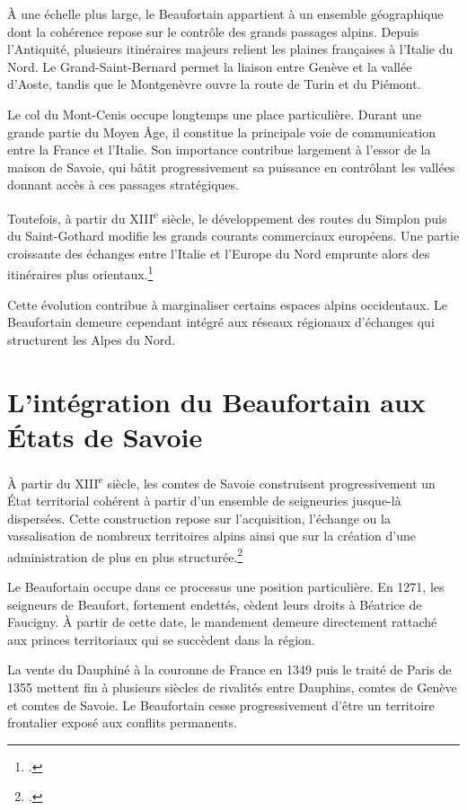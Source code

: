 \documentclass[12pt,a4paper]{report}
\begin{document}
À une échelle plus large, le Beaufortain appartient à un ensemble géographique dont la cohérence repose sur le contrôle des grands passages alpins. Depuis l'Antiquité, plusieurs itinéraires majeurs relient les plaines françaises à l'Italie du Nord. Le Grand-Saint-Bernard permet la liaison entre Genève et la vallée d'Aoste, tandis que le Montgenèvre ouvre la route de Turin et du Piémont.

Le col du Mont-Cenis occupe longtemps une place particulière. Durant une grande partie du Moyen Âge, il constitue la principale voie de communication entre la France et l'Italie. Son importance contribue largement à l'essor de la maison de Savoie, qui bâtit progressivement sa puissance en contrôlant les vallées donnant accès à ces passages stratégiques.

Toutefois, à partir du XIII\textsuperscript{e} siècle, le développement des routes du Simplon puis du Saint-Gothard modifie les grands courants commerciaux européens. Une partie croissante des échanges entre l'Italie et l'Europe du Nord emprunte alors des itinéraires plus orientaux.\footcite[63--82]{PRacine2003}

Cette évolution contribue à marginaliser certains espaces alpins occidentaux. Le Beaufortain demeure cependant intégré aux réseaux régionaux d'échanges qui structurent les Alpes du Nord.

\section{L'intégration du Beaufortain aux États de Savoie}

À partir du XIII\textsuperscript{e} siècle, les comtes de Savoie construisent progressivement un État territorial cohérent à partir d'un ensemble de seigneuries jusque-là dispersées. Cette construction repose sur l'acquisition, l'échange ou la vassalisation de nombreux territoires alpins ainsi que sur la création d'une administration de plus en plus structurée.\footcite[59]{Mouthon2016}

Le Beaufortain occupe dans ce processus une position particulière. En 1271, les seigneurs de Beaufort, fortement endettés, cèdent leurs droits à Béatrice de Faucigny. À partir de cette date, le mandement demeure directement rattaché aux princes territoriaux qui se succèdent dans la région.

La vente du Dauphiné à la couronne de France en 1349 puis le traité de Paris de 1355 mettent fin à plusieurs siècles de rivalités entre Dauphins, comtes de Genève et comtes de Savoie. Le Beaufortain cesse progressivement d'être un territoire frontalier exposé aux conflits permanents.
\end{document}
